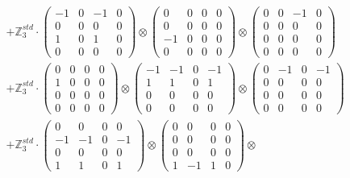 \documentclass{article}
\begin{document}
{\begin{align}
        &+ \label{Rs16-Rc11-Solution-13-c22} \mathbb{Z}_3^{std} \cdot 
            \begin{pmatrix} -1 & 0 & -1 & 0 \\ 0 & 0 & 0 & 0 \\ 1 & 0 & 1 & 0 \\ 0 & 0 & 0 & 0 \end{pmatrix} \otimes 
            \begin{pmatrix} 0 & 0 & 0 & 0 \\ 0 & 0 & 0 & 0 \\ -1 & 0 & 0 & 0 \\ 0 & 0 & 0 & 0 \end{pmatrix} \otimes 
            \begin{pmatrix} 0 & 0 & -1 & 0 \\ 0 & 0 & 0 & 0 \\ 0 & 0 & 0 & 0 \\ 0 & 0 & 0 & 0 \end{pmatrix} \\ 
        &+ \label{Rs16-Rc11-Solution-13-c23} \mathbb{Z}_3^{std} \cdot 
            \begin{pmatrix} 0 & 0 & 0 & 0 \\ 1 & 0 & 0 & 0 \\ 0 & 0 & 0 & 0 \\ 0 & 0 & 0 & 0 \end{pmatrix} \otimes 
            \begin{pmatrix} -1 & -1 & 0 & -1 \\ 1 & 1 & 0 & 1 \\ 0 & 0 & 0 & 0 \\ 0 & 0 & 0 & 0 \end{pmatrix} \otimes 
            \begin{pmatrix} 0 & -1 & 0 & -1 \\ 0 & 0 & 0 & 0 \\ 0 & 0 & 0 & 0 \\ 0 & 0 & 0 & 0 \end{pmatrix} \\ 
        &+ \label{Rs16-Rc11-Solution-13-c24} \mathbb{Z}_3^{std} \cdot 
            \begin{pmatrix} 0 & 0 & 0 & 0 \\ -1 & -1 & 0 & -1 \\ 0 & 0 & 0 & 0 \\ 1 & 1 & 0 & 1 \end{pmatrix} \otimes 
            \begin{pmatrix} 0 & 0 & 0 & 0 \\ 0 & 0 & 0 & 0 \\ 0 & 0 & 0 & 0 \\ 1 & -1 & 1 & 0 \end{pmatrix} \otimes 

\end{align}}
\end{document}
